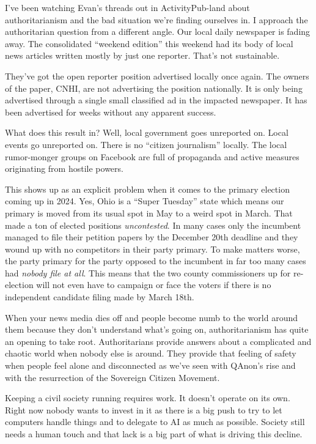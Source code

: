 I've been watching Evan's threads out in ActivityPub-land about
authoritarianism and the bad situation we're finding ourselves in. I
approach the authoritarian question from a different angle. Our local
daily newspaper is fading away. The consolidated ``weekend edition''
this weekend had its body of local news articles written mostly by just
one reporter. That's not sustainable.

They've got the open reporter position advertised locally once again.
The owners of the paper, CNHI, are not advertising the position
nationally. It is only being advertised through a single small
classified ad in the impacted newspaper. It has been advertised for
weeks without any apparent success.

What does this result in? Well, local government goes unreported on.
Local events go unreported on. There is no ``citizen journalism''
locally. The local rumor-monger groups on Facebook are full of
propaganda and active measures originating from hostile powers.

This shows up as an explicit problem when it comes to the primary
election coming up in 2024. Yes, Ohio is a ``Super Tuesday'' state which
means our primary is moved from its usual spot in May to a weird spot in
March. That made a ton of elected positions \emph{uncontested}. In many
cases only the incumbent managed to file their petition papers by the
December 20th deadline and they wound up with no competitors in their
party primary. To make matters worse, the party primary for the party
opposed to the incumbent in far too many cases had \emph{nobody file at
all}. This means that the two county commissioners up for re-election
will not even have to campaign or face the voters if there is no
independent candidate filing made by March 18th.

When your news media dies off and people become numb to the world around
them because they don't understand what's going on, authoritarianism has
quite an opening to take root. Authoritarians provide answers about a
complicated and chaotic world when nobody else is around. They provide
that feeling of safety when people feel alone and disconnected as we've
seen with QAnon's rise and with the resurrection of the Sovereign
Citizen Movement.

Keeping a civil society running requires work. It doesn't operate on its
own. Right now nobody wants to invest in it as there is a big push to
try to let computers handle things and to delegate to AI as much as
possible. Society still needs a human touch and that lack is a big part
of what is driving this decline.

